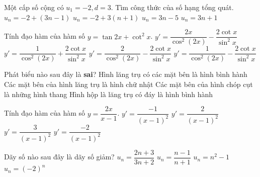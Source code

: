 \begin{ex}%
	Một cấp số cộng có $u_1=-2, d=3$. Tìm công thức của số hạng tổng quát.
	\choice
	{$u_n=-2+(3n-1)$}
	{$u_n=-2+3(n+1)$}
	{\True $u_n=3n-5$}
	{$u_n=3n+1$}
\end{ex}

\begin{ex}%
	Tính đạo hàm của hàm số $y=\tan 2x+\cot^2x$.
	\choice
	{$y'=\dfrac{2x}{\cos^2(2x)}-\dfrac{2\cot x}{\sin^2x}$}
	{$y'=\dfrac{1}{\cos^2(2x)}+\dfrac{2\cot x}{\sin^2x}$}
	{\True $y'=\dfrac{2}{\cos^2(2x)}-\dfrac{2\cot x}{\sin^2x}$}
	{$y'=\dfrac{1}{\cos^2(2x)}-\dfrac{2\cot x}{\sin^2x}$}
\end{ex}

\begin{ex}%
	Phát biểu nào sau đây là \textbf{sai}?
	\choice
	{Hình lăng trụ có các mặt bên là hình bình hành}
	{\True Các mặt bên của hình lăng trụ là hình chữ nhật}
	{Các mặt bên của hình chóp cụt là những hình thang}
	{Hình hộp là lăng trụ có đáy là hình bình hành}
\end{ex}

\begin{ex}%
	Tính đạo hàm của hàm số $y=\dfrac{2x}{x-1}$.
	\choice
	{$y'=\dfrac{-1}{(x-1)^2}$}
	{$y'=\dfrac{2}{(x-1)^2}$}
	{$y'=\dfrac{3}{(x-1)^2}$}
	{\True $y'=\dfrac{-2}{(x-1)^2}$}
\end{ex}

\begin{ex}%
	Dãy số nào sau đây là dãy số giảm?
	\choice
	{\True $u_n=\dfrac{2n+3}{3n+2}$}
	{$u_n=\dfrac{n-1}{n+1}$}
	{$u_n=n^2-1$}
	{$u_n=(-2)^n$}
\end{ex}

